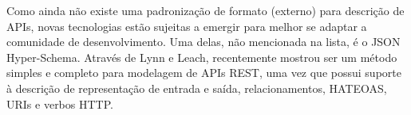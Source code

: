 Como ainda não existe uma padronização de formato (externo) para descrição de APIs, novas tecnologias estão sujeitas a emergir para melhor se adaptar a comunidade de desenvolvimento. Uma delas, não mencionada na lista, é o JSON Hyper-Schema. Através de Lynn e Leach, recentemente mostrou ser um método simples e completo para modelagem de APIs REST, uma vez que possui suporte à descrição de representação de entrada e saída, relacionamentos, HATEOAS, URIs e verbos HTTP. \cite{LynnEtAl2016,Leach2014}
